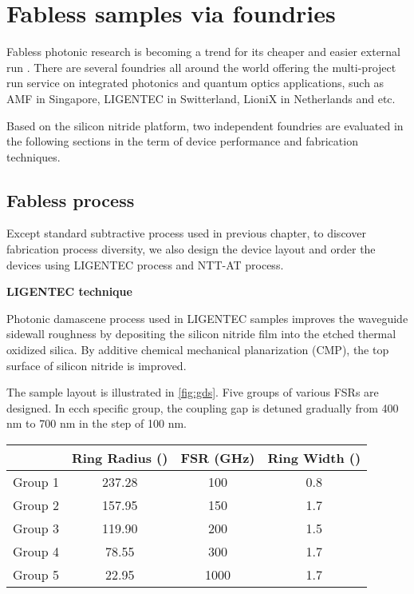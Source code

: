 
\chapter{Fabless samples via foundries}

Fabless photonic research is becoming a trend for its cheaper and easier external run \cite{Hochberg2010}. There are several foundries all around the world offering the multi-project run service on integrated photonics and quantum optics applications, such as AMF in Singapore, LIGENTEC in Switterland, LioniX in Netherlands and etc. 

Based on the silicon nitride platform, two independent foundries are evaluated in the following sections in the term of device performance and fabrication techniques.

\section{Fabless process}
Except standard subtractive process used in previous chapter, to discover fabrication process diversity, we also design the device layout and order the devices using LIGENTEC process and NTT-AT process.

\bigskip
\noindent\textbf{LIGENTEC technique}

Photonic damascene process \cite{Pfeiffer2015a,Pfeiffer2018a} used in LIGENTEC samples improves the waveguide sidewall roughness by depositing the silicon nitride film into the etched thermal oxidized silica. By additive chemical mechanical planarization (CMP), the top surface of silicon nitride is improved.

The sample layout is illustrated in \autoref{fig:gds}. Five groups of various FSRs are designed. In ecch specific group, the coupling gap is detuned gradually from 400 nm to 700 nm in the step of 100 nm.


\begin{table}[]
	\begin{tabular}{cccc}
		& Ring Radius (\um) & FSR (GHz) & Ring Width (\um) \\ \hline
		Group 1 & 237.28                                                 & 100       & 0.8                                                   \\ \hline
		Group 2 & 157.95                                                 & 150       & 1.7                                                   \\ \hline
		Group 3 & 119.90                                                 & 200       & 1.5                                                   \\ \hline
		Group 4 & 78.55                                                  & 300       & 1.7                                                   \\ \hline
		Group 5 & 22.95                                                  & 1000      & 1.7                                                   \\ \hline
	\end{tabular}
\end{table}


